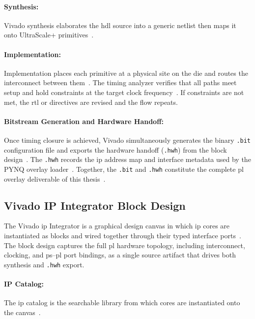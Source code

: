 \paragraph{Synthesis:}
Vivado synthesis elaborates the \ac{hdl} source into a generic netlist
then maps it onto UltraScale+ primitives~\cite{AMD_UG892}.

\paragraph{Implementation:}
Implementation places each primitive at a physical site on the die
and routes the interconnect between them~\cite{AMD_UG892}.
The timing analyzer verifies that all paths meet setup and hold
constraints at the target clock frequency~\cite{AMD_UG892}.
If constraints are not met, the \ac{rtl} or directives are revised
and the flow repeats.

\paragraph{Bitstream Generation and Hardware Handoff:}
Once timing closure is achieved, Vivado simultaneously generates the
binary \texttt{.bit} configuration file and exports the hardware
handoff (\texttt{.hwh}) from the block design~\cite{AMD_UG892}.
The \texttt{.hwh} records the \ac{ip} address map and interface
metadata used by the PYNQ overlay loader~\cite{PYNQ_DOC}.
Together, the \texttt{.bit} and \texttt{.hwh} constitute the complete
\ac{pl} overlay deliverable of this thesis~\cite{PYNQ_DOC,Kovacs2024}.


\subsection{Vivado IP Integrator Block Design}
\label{subsec:ip_integrator}

The Vivado \ac{ip} Integrator is a graphical design canvas in which
\ac{ip} cores are instantiated as blocks and wired together through
their typed interface ports~\cite{AMD_UG994}.
The block design captures the full \ac{pl} hardware topology,
including interconnect, clocking, and \ac{ps}--\ac{pl} port bindings,
as a single source artifact that drives both synthesis and
\texttt{.hwh} export.

\paragraph{IP Catalog:}
The \ac{ip} catalog is the searchable library from which cores are
instantiated onto the canvas~\cite{AMD_UG994}.

